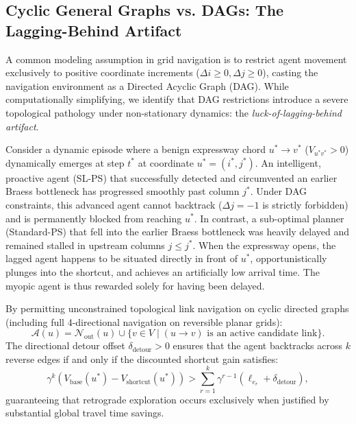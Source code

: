\documentclass[11pt,a4paper]{article}
\begin{document}
\subsection{Cyclic General Graphs vs. DAGs: The Lagging-Behind Artifact}
\label{sec:dag_vs_cyclic}
A common modeling assumption in grid navigation is to restrict agent movement exclusively to positive coordinate increments ($\Delta i \ge 0, \Delta j \ge 0$), casting the navigation environment as a Directed Acyclic Graph (DAG). While computationally simplifying, we identify that DAG restrictions introduce a severe topological pathology under non-stationary dynamics: the \textit{luck-of-lagging-behind artifact}.

Consider a dynamic episode where a benign expressway chord $u^* \to v^*$ ($V_{u^* v^*} > 0$) dynamically emerges at step $t^*$ at coordinate $u^* = (i^*, j^*)$. An intelligent, proactive agent (SL-PS) that successfully detected and circumvented an earlier Braess bottleneck has progressed smoothly past column $j^*$. Under DAG constraints, this advanced agent cannot backtrack ($\Delta j = -1$ is strictly forbidden) and is permanently blocked from reaching $u^*$. In contrast, a sub-optimal planner (Standard-PS) that fell into the earlier Braess bottleneck was heavily delayed and remained stalled in upstream columns $j \le j^*$. When the expressway opens, the lagged agent happens to be situated directly in front of $u^*$, opportunistically plunges into the shortcut, and achieves an artificially low arrival time. The myopic agent is thus rewarded solely for having been delayed.

By permitting unconstrained topological link navigation on cyclic directed graphs (including full 4-directional navigation on reversible planar grids):
\begin{equation}
\mathcal{A}(u) = \mathcal{N}_{\text{out}}(u) \cup \{ v \in V \mid (u \to v) \text{ is an active candidate link} \}.
\end{equation}
The directional detour offset $\delta_{\text{detour}} > 0$ ensures that the agent backtracks across $k$ reverse edges if and only if the discounted shortcut gain satisfies:
\begin{equation}
\label{eq:detour_condition}
\gamma^k \left( V_{\text{base}}(u^*) - V_{\text{shortcut}}(u^*) \right) > \sum_{r=1}^k \gamma^{r-1} \left( \ell_{e_r} + \delta_{\text{detour}} \right),
\end{equation}
guaranteeing that retrograde exploration occurs exclusively when justified by substantial global travel time savings.
\end{document}
